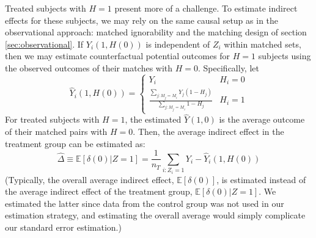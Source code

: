 \documentclass{article}
\newcommand{\EE}{\mathbb{E}}
\begin{document}
Treated subjects with $H=1$ present more of a challenge.
To estimate indirect effects for these subjects, we may rely on the
same causal setup as in the observational approach:
matched ignorability and the matching design of section
\ref{sec:observational}.
If $Y_i(1,H(0))$ is independent of $Z_i$ within matched sets, then we
may estimate counterfactual potential outcomes for $H=1$ subjects
using the observed outcomes of their matches with $H=0$.
Specifically, let
\begin{equation*}
\hat{Y}_i(1,H(0))=\begin{cases}
 Y_i & H_i=0\\[3ex]
\frac{\displaystyle\sum_{j:M_j=M_i}
  Y_j(1-H_j)}{\displaystyle\sum_{j:M_j=M_i} 1-H_j} & H_i=1
\end{cases}
\end{equation*}
For treated subjects with $H=1$, the estimated $\hat{Y}(1,0)$ is the
average outcome of their matched pairs with $H=0$.
Then, the average indirect effect in the treatment group can be
estimated as:
\begin{equation*}
 \hat{\Delta}\equiv\widehat{\EE[\delta(0)|Z=1]}=\frac{1}{n_T}\displaystyle\sum_{i:Z_i=1} Y_i-\hat{Y}_i(1,H(0))
\end{equation*}
(Typically, the overall average indirect effect, $\EE[\delta(0)]$, is
estimated instead of the average indirect effect of the treatment
group, $\EE[\delta(0)|Z=1]$.
We estimated the latter since data from the control group was not used
in our estimation strategy, and estimating the overall average would
simply complicate our standard error estimation.)
\end{document}
